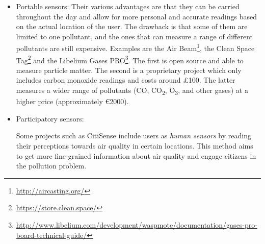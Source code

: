 \begin{itemize}
\item Portable sensors: Their various advantages are that they can be carried throughout the day and allow for more personal and accurate readings based on the actual location of the user. The drawback is that some of them are limited to one pollutant, and the ones that can measure a range of different pollutants are still expensive. Examples are the Air Beam\footnote{\url{http://aircasting.org/}}, the Clean Space Tag\footnote{\url{https://store.clean.space/}} and the Libelium Gases PRO\footnote{\url{http://www.libelium.com/development/waspmote/documentation/gases-pro-board-technical-guide/}}. The first is open source and able to measure particle matter. The second is a proprietary project which only includes carbon monoxide readings and costs around \pounds100. The latter measures a wider range of pollutants (CO, CO\textsubscript{2}, O\textsubscript{3}, \NOX and other gases) at a higher price (approximately \euro{}2000). 

\item Participatory sensors:

Some projects such as CitiSense \cite{Nikzad2012} include users as \textit{human sensors} by reading their perceptions towards air quality in certain locations. This method aims to get more fine-grained information about air quality and engage citizens in the pollution problem. 

\end{itemize}



